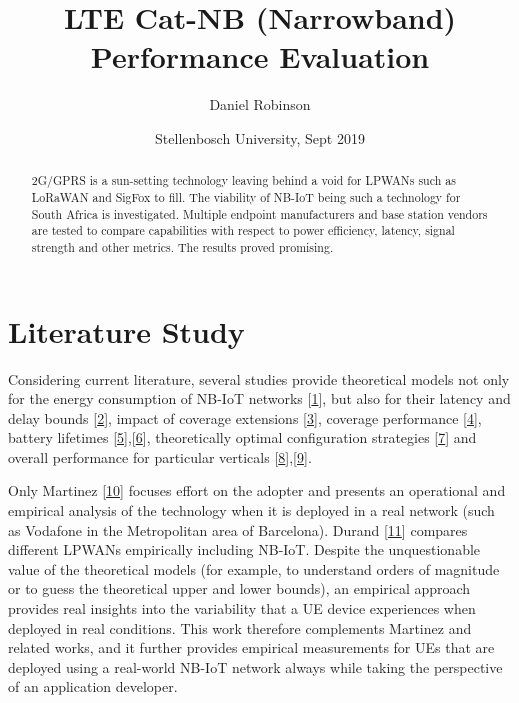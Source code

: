 \documentclass[]{article}
\title{LTE Cat-NB (Narrowband) Performance Evaluation}
\author{Daniel Robinson}
\date{Stellenbosch University, Sept 2019}
\begin{document}
\maketitle
\begin{abstract}
2G/GPRS is a sun-setting technology leaving behind a void for LPWANs
such as LoRaWAN and SigFox to fill. The viability of NB-IoT being such a
technology for South Africa is investigated. Multiple endpoint
manufacturers and base station vendors are tested to compare
capabilities with respect to power efficiency, latency, signal strength
and other metrics. The results proved promising.
\end{abstract}

{
\hypersetup{linkcolor=}
\setcounter{tocdepth}{3}
\tableofcontents
}
\listoftables
\listoffigures
\hypertarget{litstudy}{%
\section{Literature Study}\label{litstudy}}

Considering current literature, several studies provide theoretical
models not only for the energy consumption of NB-IoT networks
{[}\protect\hyperlink{ref-Andres-Maldonado2017}{1}{]}, but also for
their latency and delay bounds
{[}\protect\hyperlink{ref-Feltrin2019}{2}{]}, impact of coverage
extensions {[}\protect\hyperlink{ref-Andres-Maldonado2018b}{3}{]},
coverage performance {[}\protect\hyperlink{ref-Adhikary2016}{4}{]},
battery lifetimes
{[}\protect\hyperlink{ref-Yeoh2018d}{5}{]},{[}\protect\hyperlink{ref-Lauridsen2018}{6}{]},
theoretically optimal configuration strategies
{[}\protect\hyperlink{ref-Feltrin2018}{7}{]} and overall performance for
particular verticals
{[}\protect\hyperlink{ref-Soussi2018}{8}{]},{[}\protect\hyperlink{ref-Beyene2017b}{9}{]}.

Only Martinez {[}\protect\hyperlink{ref-Martinez2019}{10}{]} focuses
effort on the adopter and presents an operational and empirical analysis
of the technology when it is deployed in a real network (such as
Vodafone in the Metropolitan area of Barcelona). Durand
{[}\protect\hyperlink{ref-Thomas2018}{11}{]} compares different LPWANs
empirically including NB-IoT. Despite the unquestionable value of the
theoretical models (for example, to understand orders of magnitude or to
guess the theoretical upper and lower bounds), an empirical approach
provides real insights into the variability that a UE device experiences
when deployed in real conditions. This work therefore complements
Martinez and related works, and it further provides empirical
measurements for UEs that are deployed using a real-world NB-IoT network
always while taking the perspective of an application developer.
\end{document}

